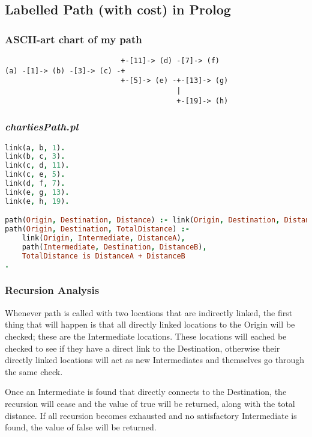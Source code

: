 \documentclass[12pt]{article}
\begin{document}
	\subsection{Labelled Path (with cost) in Prolog}
	\subsubsection{ASCII-art chart of my path}
	\begin{lstlisting}
                           +-[11]-> (d) -[7]-> (f)
(a) -[1]-> (b) -[3]-> (c) -+
                           +-[5]-> (e) -+-[13]-> (g)
                                        |
                                        +-[19]-> (h)
	\end{lstlisting}

	\subsubsection{\textit{charliesPath.pl}}
	\begin{lstlisting}[language = Prolog, tabsize = 8]
link(a, b, 1).
link(b, c, 3).
link(c, d, 11).
link(c, e, 5).
link(d, f, 7).
link(e, g, 13).
link(e, h, 19).

path(Origin, Destination, Distance) :- link(Origin, Destination, Distance).
path(Origin, Destination, TotalDistance) :-
	link(Origin, Intermediate, DistanceA),
	path(Intermediate, Destination, DistanceB),
	TotalDistance is DistanceA + DistanceB
.
	\end{lstlisting}

	\subsubsection{Recursion Analysis}
	Whenever path is called with two locations that are indirectly linked, the first thing that will happen is that all directly linked locations to the Origin will be checked; these are the Intermediate locations. These locations will eached be checked to see if they have a direct link to the Destination, otherwise their directly linked locations will act as new Intermediates and themselves go through the same check. \linebreak

	Once an Intermediate is found that directly connects to the Destination, the recursion will cease and the value of true will be returned, along with the total distance. If all recursion becomes exhausted and no satisfactory Intermediate is found, the value of false will be returned.
	\pagebreak
\end{document}
